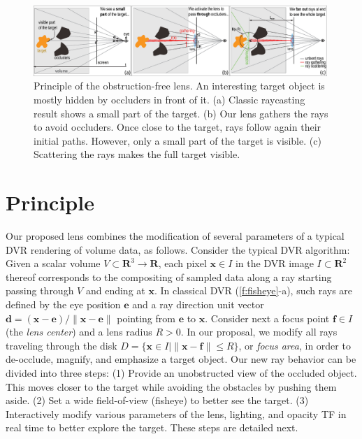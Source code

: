 \begin{figure}[htbp]
\centering
\vspace{-0.15cm}
\includegraphics [width=0.99\textwidth]{images/principle.eps}
\vspace{-0.15cm}
\caption{Principle of the obstruction-free lens. An interesting target object is mostly hidden by occluders in front of it. (a) Classic raycasting result shows a small part of the target. (b) Our lens gathers the rays to avoid occluders. Once close to the target, rays follow again their initial paths. However, only a small part of the target is visible. (c) Scattering the rays makes the full target visible.}
\label{f:fisheye}
\vspace{-0.15cm}
\end{figure}

\vspace{-0.15cm}
\section{Principle}
\label{sec:principle}
%
%
Our proposed lens combines the modification of several parameters of a typical DVR rendering of volume data, as follows. Consider the typical DVR algorithm: Given a scalar volume $V \subset \mathbf{R}^3 \rightarrow \mathbf{R}$, each pixel $\mathbf{x} \in I$ in the DVR image $I \subset \mathbf{R}^2$ thereof corresponds to the compositing of sampled data along a ray starting passing through $V$ and ending at $\mathbf{x}$. In classical DVR (\autoref{f:fisheye}-a), such rays are defined by the eye position $\mathbf{e}$ and a ray direction unit vector $\mathbf{d} = (\mathbf{x} - \mathbf{e}) / \| \mathbf{x} - \mathbf{e} \|$ pointing from $\mathbf{e}$ to $\mathbf{x}$. Consider next a focus point $\mathbf{f} \in I$ (the \emph{lens center}) and a lens radius $R > 0$. In our proposal, we modify all rays traveling through the disk $D = \{\mathbf{x} \in I | \| \mathbf{x} - \mathbf{f} \| \leq R\}$, or \emph{focus area}, in order to de-occlude, magnify, and emphasize a target object. Our new ray behavior can be divided into three steps: (1) Provide an unobstructed view of the occluded object. This moves closer to the target while avoiding the obstacles by pushing them aside. (2) Set a wide field-of-view (fisheye) to better see the target. (3) Interactively modify various parameters of the lens, lighting, and opacity TF in real time to better explore the target. These steps are detailed next.

